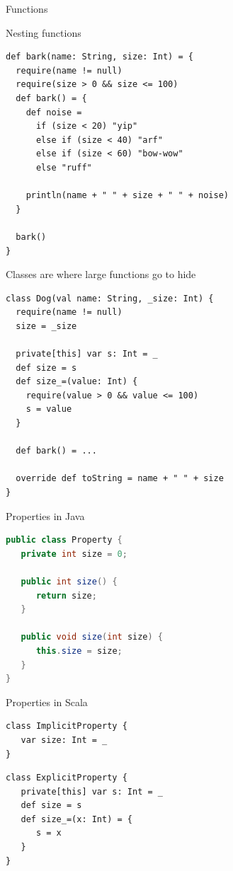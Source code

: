 \begin{frame}[fragile]{Functions}
\begin{exampleblock}{Nesting functions}
\begin{lstlisting}
def bark(name: String, size: Int) = {
  require(name != null)
  require(size > 0 && size <= 100)
  def bark() = {
    def noise =
      if (size < 20) "yip"
      else if (size < 40) "arf"
      else if (size < 60) "bow-wow"
      else "ruff"
        
    println(name + " " + size + " " + noise)
  }
  
  bark()
}
\end{lstlisting}
\end{exampleblock}
\end{frame}

\begin{frame}[fragile]{Classes are where large functions go to hide}
\begin{lstlisting}
class Dog(val name: String, _size: Int) {
  require(name != null)
  size = _size

  private[this] var s: Int = _
  def size = s
  def size_=(value: Int) {
    require(value > 0 && value <= 100)
    s = value
  }

  def bark() = ...
  
  override def toString = name + " " + size
}
\end{lstlisting}
\end{frame}

\begin{frame}[fragile]{Properties in Java}
\begin{lstlisting}[language=java]
public class Property {
   private int size = 0;

   public int size() {
      return size;
   }

   public void size(int size) {
      this.size = size;
   }
}
\end{lstlisting}
\end{frame}

\begin{frame}[fragile]{Properties in Scala}
\begin{lstlisting}
class ImplicitProperty {
   var size: Int = _
}
\end{lstlisting}
\pause
\begin{lstlisting}
class ExplicitProperty {
   private[this] var s: Int = _
   def size = s	
   def size_=(x: Int) = {
      s = x
   }
}
\end{lstlisting}
\end{frame}

